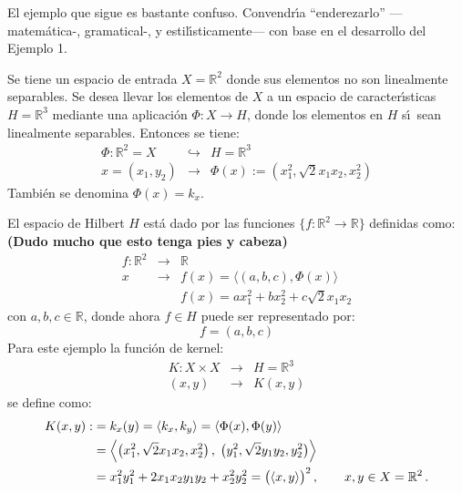 {\color{red} 
El ejemplo que sigue es bastante confuso.
Convendr\'\i a ``enderezarlo'' ---matem\'atica-, gramatical-,
y estil\'\i sticamente--- con base en el desarrollo del
Ejemplo 1.

\smallskip\noindent
Se tiene un espacio de entrada $X=\mathbb{R}^2$ donde sus elementos
no son linealmente separables. 
Se desea llevar los elementos de $X$ a un espacio de caracter\'\i sticas
$H=\mathbb{R}^3$ mediante una aplicaci\'on 
$\Phi:X\to H$, donde los elementos en $H$ s\'\i\ sean linealmente
separables. 
Entonces se tiene:
\begin{eqnarray*}
\Phi: \mathbb{R}^2=X &\hookrightarrow &H=\mathbb{R}^3 \\
x=(x_1,y_2) &\rightarrow & \Phi(x):=(x_1^2,\sqrt{2}x_1 x_2,x_2^2)
\end{eqnarray*}
Tambi\'en se denomina $\Phi(x)=k_x$.


\smallskip\noindent
El espacio de Hilbert $H$ est\'a dado por las funciones
$\{f:\mathbb{R}^2 \rightarrow \mathbb{R}\}$ definidas como:
{\bf (Dudo mucho que esto tenga pies y cabeza)} 
\begin{eqnarray*}
f: \mathbb{R}^2 &\rightarrow& \mathbb{R} \\
x &\rightarrow& f(x) = \langle (a,b,c), \Phi(x)\rangle \\
& & f(x) = a x_1^2 + b x_2 ^2 + c \sqrt{2} x_1 x_2
\end{eqnarray*}
con $a,b,c\in\mathbb{R}$, donde ahora $f\in H$ puede ser representado
por:
\begin{equation}
f= (a,b,c)
\end{equation}
Para este ejemplo la funci\'on de kernel:
\begin{eqnarray*}
K: X \times X &\rightarrow &H=\mathbb{R}^3 \\
    (x,y) &\rightarrow & K(x,y)
\end{eqnarray*}
se define como:
\begin{align*}\smash[t]
K(x,y):
&= k_x(y)
 = \langle k_x, k_y \rangle
 = \langle \Phi(x), \Phi(y) \rangle \\
&= \left\langle \big( x_1^2,\sqrt{2}x_1 x_2,x_2^2 \big)\,,\;
                \big( y_1^2,\sqrt{2}y_1 y_2,y_2^2 \big) \right\rangle \\
&= x_1^2 y_1^2 + 2x_1x_2y_1 y_2 + x_2^2 y_2^2
 = \big(\langle x,y \rangle \big)^2\,,\qquad x,y\in X=\mathbb{R}^2\,.
\end{align*}
}



